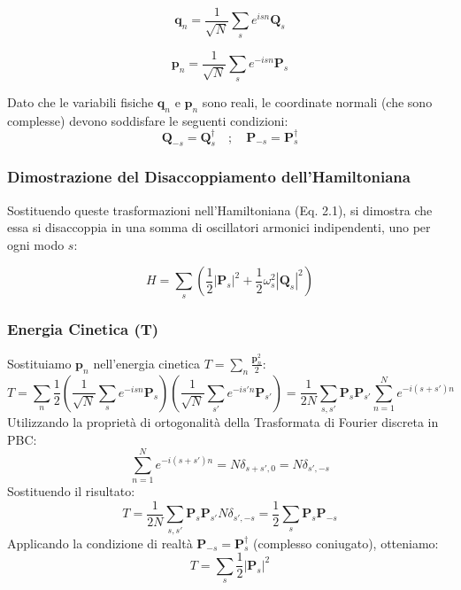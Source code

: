 \begin{equation}
\mathbf{q}_n = \frac{1}{\sqrt{N}} \sum_{s} e^{is n} \mathbf{Q}_s
\end{equation}

\begin{equation}
\mathbf{p}_n = \frac{1}{\sqrt{N}} \sum_{s} e^{-is n} \mathbf{P}_s
\end{equation}

Dato che le variabili fisiche $\mathbf{q}_n$ e $\mathbf{p}_n$ sono reali, le coordinate normali (che sono complesse) devono soddisfare le seguenti condizioni:
$$
\mathbf{Q}_{-s} = \mathbf{Q}_s^{\dagger} \quad ; \quad \mathbf{P}_{-s} = \mathbf{P}_s^{\dagger}
$$

\subsubsection{Dimostrazione del Disaccoppiamento dell'Hamiltoniana}

Sostituendo queste trasformazioni nell'Hamiltoniana (Eq. 2.1), si dimostra che essa si disaccoppia in una somma di oscillatori armonici indipendenti, uno per ogni modo $s$:

\begin{equation}
H = \sum_{s} \left( \frac{1}{2}|\mathbf{P}_s|^2 + \frac{1}{2}\omega_s^2 |\mathbf{Q}_s|^2 \right)
\end{equation}

\subsubsection{Energia Cinetica (T)}
Sostituiamo $\mathbf{p}_n$ nell'energia cinetica $T = \sum_{n} \frac{\mathbf{p}_n^2}{2}$:
$$
T = \sum_{n} \frac{1}{2} \left( \frac{1}{\sqrt{N}} \sum_{s} e^{-is n} \mathbf{P}_s \right) \left( \frac{1}{\sqrt{N}} \sum_{s'} e^{-is' n} \mathbf{P}_{s'} \right) = \frac{1}{2N} \sum_{s, s'} \mathbf{P}_s \mathbf{P}_{s'} \sum_{n=1}^{N} e^{-i(s+s') n}
$$
Utilizzando la proprietà di ortogonalità della Trasformata di Fourier discreta in PBC:
$$
\sum_{n=1}^{N} e^{-i(s+s') n} = N \delta_{s+s', 0} = N \delta_{s', -s}
$$
Sostituendo il risultato:
$$
T = \frac{1}{2N} \sum_{s, s'} \mathbf{P}_s \mathbf{P}_{s'} N \delta_{s', -s} = \frac{1}{2} \sum_{s} \mathbf{P}_s \mathbf{P}_{-s}
$$
Applicando la condizione di realtà $\mathbf{P}_{-s} = \mathbf{P}_s^{\dagger}$ (complesso coniugato), otteniamo:
\begin{equation}
T = \sum_{s} \frac{1}{2} |\mathbf{P}_s|^2
\end{equation}

